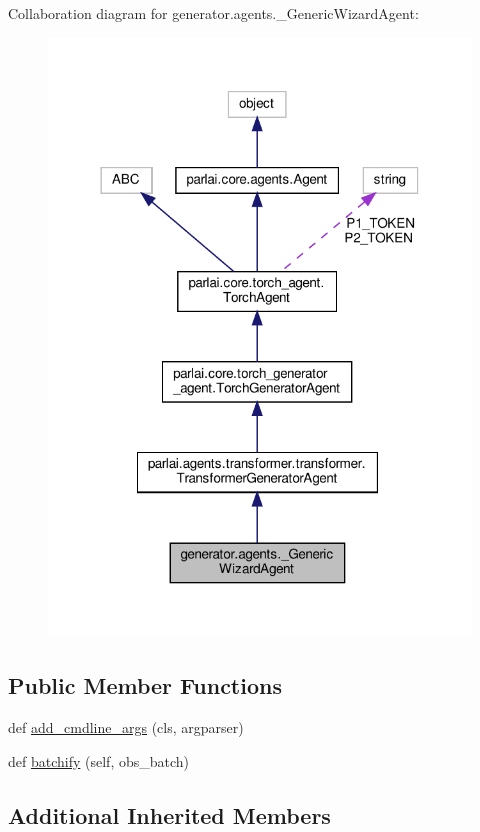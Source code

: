 Collaboration diagram for generator.\+agents.\+\_\+\+Generic\+Wizard\+Agent\+:
\nopagebreak
\begin{figure}[H]
\begin{center}
\leavevmode
\includegraphics[width=318pt]{classgenerator_1_1agents_1_1__GenericWizardAgent__coll__graph}
\end{center}
\end{figure}
\subsection*{Public Member Functions}
\begin{DoxyCompactItemize}
\item 
def \hyperlink{classgenerator_1_1agents_1_1__GenericWizardAgent_ab3f4b6508b1814bc3c1e28b8ce551feb}{add\+\_\+cmdline\+\_\+args} (cls, argparser)
\item 
def \hyperlink{classgenerator_1_1agents_1_1__GenericWizardAgent_a2349defb36c114aebf3beabfe69bbd77}{batchify} (self, obs\+\_\+batch)
\end{DoxyCompactItemize}
\subsection*{Additional Inherited Members}


